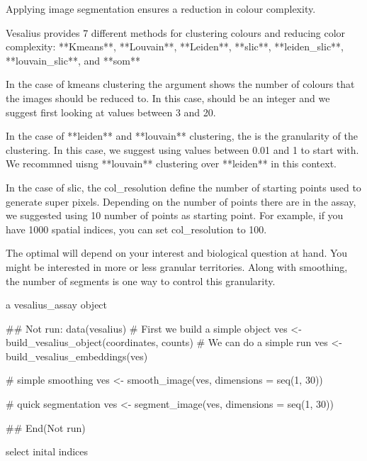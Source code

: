\documentclass[a4paper]{book}
\begin{document}
\begin{Details}
Applying image segmentation ensures a reduction in colour
complexity.

Vesalius provides 7 different methods for clustering colours and
reducing color complexity: **Kmeans**, **Louvain**, **Leiden**,
**slic**, **leiden\_slic**, **louvain\_slic**, and **som**

In the case of kmeans clustering the  argument
shows the number of colours that the images should be reduced to.
In this case,  should be an integer and
we suggest first looking at values between 3 and 20.

In the case of **leiden** and **louvain** clustering, the
 is the granularity of the clustering.
In this case, we suggest using values between 0.01 and 1 to start with.
We recommned uisng **louvain** clustering over **leiden** in
this context.

In the case of slic, the col\_resolution define the number of starting
points used to generate super pixels. Depending on the number of
points there are in the assay, we suggested using 10
number of points as starting point. 
For example, if you have  1000 spatial indices, you can set 
col\_resolution to 100.

The optimal  will depend on your interest and 
biological question at hand. You might be interested in more or less
granular territories. Along with smoothing, the number of segments is
one way to control this granularity.
\end{Details}
%
\begin{Value}
a vesalius\_assay object
\end{Value}
%
\begin{Examples}
\begin{ExampleCode}
## Not run: 
data(vesalius)
# First we build a simple object
ves <- build_vesalius_object(coordinates, counts)
# We can do a simple run
ves <- build_vesalius_embeddings(ves)

# simple smoothing
ves <- smooth_image(ves, dimensions = seq(1, 30))

# quick segmentation
ves <- segment_image(ves, dimensions = seq(1, 30))

## End(Not run)
\end{ExampleCode}
\end{Examples}
%
\begin{Description}
select inital indices
\end{Description}
\end{document}
